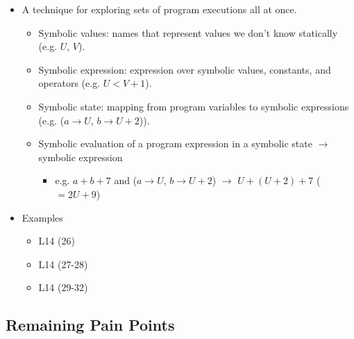 \documentclass{article}
\begin{document}
\begin{itemize}
    \item A technique for exploring sets of program executions all at once.
    \begin{itemize}
        \item Symbolic values: names that represent values we don't know statically (e.g. $U$, $V$).
        \item Symbolic expression: expression over symbolic values, constants, and operators (e.g. $U < V + 1$).
        \item Symbolic state: mapping from program variables to symbolic expressions (e.g. ($a \rightarrow U$, $b \rightarrow U + 2$)).
        \item Symbolic evaluation of a program expression in a symbolic state $\rightarrow$ symbolic expression
        \begin{itemize}
            \item e.g. $a + b + 7$ and ($a \rightarrow U$, $b \rightarrow U + 2$) $\rightarrow$ $U + (U + 2) + 7$ ($= 2U + 9$)
        \end{itemize}
    \end{itemize}
    \item Examples
    \begin{itemize}
        \item L14 (26)
        \item L14 (27-28)
        \item L14 (29-32)
    \end{itemize}
\end{itemize}

\subsection{Remaining Pain Points}
\end{document}
